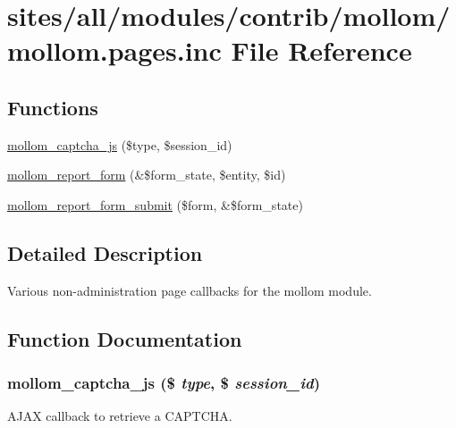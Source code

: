 \hypertarget{mollom_8pages_8inc}{
\section{sites/all/modules/contrib/mollom/mollom.pages.inc File Reference}
\label{mollom_8pages_8inc}
}
\subsection*{Functions}
\begin{CompactItemize}
\item 
\hyperlink{mollom_8pages_8inc_4cce4473bb53417b30e6858a4f746d70}{mollom\_\-captcha\_\-js} (\$type, \$session\_\-id)
\item 
\hyperlink{mollom_8pages_8inc_0aa683f81a3e5993abd967762344272a}{mollom\_\-report\_\-form} (\&\$form\_\-state, \$entity, \$id)
\item 
\hyperlink{mollom_8pages_8inc_6b60683fcd61a267fa8f7861194f6484}{mollom\_\-report\_\-form\_\-submit} (\$form, \&\$form\_\-state)
\end{CompactItemize}


\subsection{Detailed Description}
Various non-administration page callbacks for the mollom module. 

\subsection{Function Documentation}
\hypertarget{mollom_8pages_8inc_4cce4473bb53417b30e6858a4f746d70}{
\subsubsection[{mollom\_\-captcha\_\-js}]{\setlength{\rightskip}{0pt plus 5cm}mollom\_\-captcha\_\-js (\$ {\em type}, \/  \$ {\em session\_\-id})}}
\label{mollom_8pages_8inc_4cce4473bb53417b30e6858a4f746d70}


AJAX callback to retrieve a CAPTCHA.

